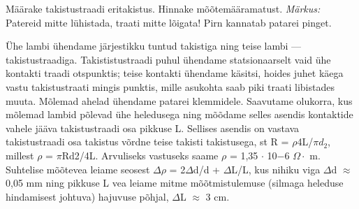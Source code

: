 
Määrake takistustraadi eritakistus. Hinnake mõõtemääramatust.
\textit{Märkus:} Patereid mitte lühistada, traati mitte lõigata! Pirn kannatab patarei pinget.

\hint

\solu
Ühe lambi ühendame järjestikku tuntud takistiga ning teise lambi --- takistustraadiga. Takististustraadi puhul ühendame statsionaarselt vaid ühe kontakti traadi otspunktis; teise kontakti ühendame käsitsi, hoides juhet käega vastu takistustraati mingis punktis, mille asukohta saab piki traati libistades muuta. Mõlemad ahelad ühendame patarei klemmidele. Saavutame olukorra, kus mõlemad lambid põlevad ühe heledusega ning mõõdame selles asendis kontaktide vahele jääva takistustraadi osa pikkuse L. Sellises asendis on vastava takistustraadi osa takistus võrdne teise takisti takistusega, st R = $\rho$4L/$\pi$$d_2$, millest $\rho$ = $\pi$Rd2/4L. Arvuliseks vastuseks saame $\rho$ = 1,35 $\cdot$ 10$-$6 $\Omega \cdot$ m. Suhtelise mõõtevea leiame seosest $\Delta\rho$ = 2$\Delta$d/d + $\Delta$L/L, kus nihiku viga $\Delta$d $\approx$ 0,05 mm ning pikkuse L vea leiame mitme mõõtmistulemuse (silmaga heleduse hindamisest johtuva) hajuvuse põhjal, $\Delta$L $\approx$ 3 cm.
\probend

